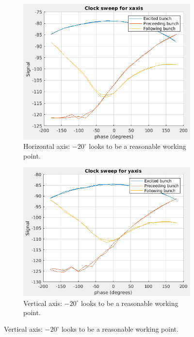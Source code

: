 \documentclass{report}
\begin{document}
\begin{figure}[hbt]
   \centering
    \begin{subfigure}[b]{0.45\textwidth}
        \includegraphics[width=\textwidth]{vlr_clock_phase_scan_x.png}
        \caption{Horizontal axis: $-20^\circ$ looks to be a reasonable working point.}
        \label{fig:frontend_clock_phase_scan_x}
    \end{subfigure}
    \begin{subfigure}[b]{0.45\textwidth}
        \includegraphics[width=\textwidth]{vlr_clock_phase_scan_y.png}
        \caption{Vertical axis: $-20^\circ$ looks to be a reasonable working point.}
        \label{fig:frontend_clock_phase_scan_y}
    \end{subfigure}
    

\end{figure}
\end{document}
